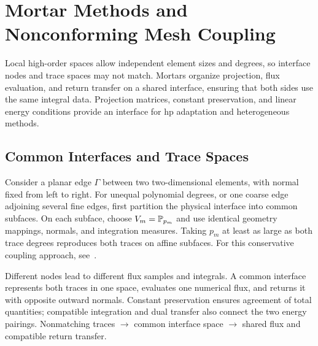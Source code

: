 \chapter{Mortar Methods and Nonconforming Mesh Coupling}\label{ch:13}
\begin{chaptersummary}
Local high-order spaces allow independent element sizes and degrees, so interface nodes and trace spaces may not match. Mortars organize projection, flux evaluation, and return transfer on a shared interface, ensuring that both sides use the same integral data. Projection matrices, constant preservation, and linear energy conditions provide an interface for hp adaptation and heterogeneous methods.
\end{chaptersummary}

\section{Common Interfaces and Trace Spaces}
Consider a planar edge $\Gamma$ between two two-dimensional elements, with normal fixed from left to right.
For unequal polynomial degrees, or one coarse edge adjoining several fine edges, first partition the physical interface into common subfaces.
On each subface, choose $V_m=\mathbb P_{p_m}$ and use identical geometry mappings, normals, and integration measures.
Taking $p_m$ at least as large as both trace degrees reproduces both traces on affine subfaces.
For this conservative coupling approach, see~\cite{kopriva1996}.

{Different nodes lead to different flux samples and integrals. A common interface represents both traces in one space,
evaluates one numerical flux, and returns it with opposite outward normals. Constant preservation ensures agreement of total quantities;
compatible integration and dual transfer also connect the two energy pairings.}
{Nonmatching traces $\longrightarrow$ common interface space $\longrightarrow$ shared flux and compatible return transfer.}

